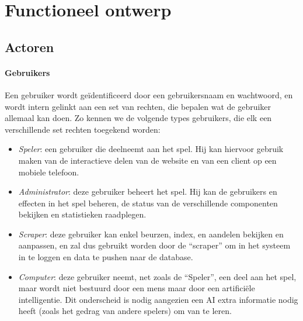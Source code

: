 %
%

\section{Functioneel ontwerp}

\subsection{Actoren}

\paragraph{Gebruikers}Een gebruiker wordt ge\"identificeerd door een gebruikersnaam en wachtwoord, en wordt intern gelinkt aan een set van rechten, die bepalen wat de gebruiker allemaal kan doen. Zo kennen we de volgende types gebruikers, die elk een verschillende set rechten toegekend worden:
\begin{itemize}
	\item{\emph{Speler}: een gebruiker die deelneemt aan het spel. Hij kan hiervoor gebruik maken van de interactieve delen van de website en van een client op een mobiele telefoon.}
	\item{\emph{Administrator}: deze gebruiker beheert het spel. Hij kan de gebruikers en effecten in het spel beheren, de status van de verschillende componenten bekijken en statistieken raadplegen.}
	\item{\emph{Scraper}: deze gebruiker kan enkel beurzen, index, en aandelen bekijken en aanpassen, en zal dus gebruikt worden door de ``scraper'' om in het systeem in te loggen en data te pushen naar de database.}
	\item{\emph{Computer}: deze gebruiker neemt, net zoals de ``Speler'', een deel aan het spel, maar wordt niet bestuurd door een mens maar door een artifici\"ele intelligentie. Dit onderscheid is nodig aangezien een AI extra informatie nodig heeft (zoals het gedrag van andere spelers) om van te leren.}
\end{itemize}

